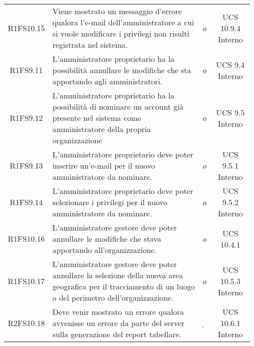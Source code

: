 {\begin{longtable}{ c C{6.5cm} c c}
R1FS10.15 & Viene mostrato un messaggio d'errore qualora l'e-mail dell'amministratore a cui si vuole modificare i privilegi non risulti registrata nel sistema. & \o & UCS 10.9.4 Interno\\

R1FS9.11 & L'amministratore proprietario ha la possibilità annullare le modifiche che sta apportando agli amministratori. & \o & UCS 9.4 Interno\\

R1FS9.12 & L'amministratore proprietario ha la possibilità di nominare un account già presente nel sistema come amministratore della propria organizzazione & \o & UCS 9.5 Interno\\

R1FS9.13 & L'amministratore proprietario deve poter inserire un'e-mail per il nuovo amministratore da nominare. & \o & UCS 9.5.1 Interno\\

R1FS9.14 & L'amministratore proprietario deve poter selezionare i privilegi per il nuovo amministratore da nominare. & \o & UCS 9.5.2 Interno\\

R1FS10.16 & L'amministratore gestore deve poter annullare le modifiche che stava apportando all'organizzazione. & \o & UCS 10.4.1\\

R1FS10.17 & L'amministratore gestore deve poter annullare la selezione della nuova area geografica per il tracciamento di un luogo o del perimetro dell'organizzazione. & \o & UCS 10.5.3 Interno\\

R2FS10.18 & Deve venir mostrato un errore qualora avvenisse un errore da parte del server sulla generazione del report tabellare. & \d & UCS 10.6.1 Interno\\

\end{longtable}
}